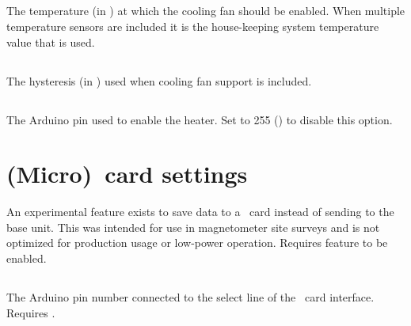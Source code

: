 \subsection[fan-temperature]{}
The temperature (in \degC{}) at which the cooling fan should be
enabled. When multiple temperature sensors are included it is the
house-keeping system temperature value that is used.

\subsection[fan-temperature-hysteresis]{}
The hysteresis (in \degC{}) used when cooling fan support is included.

\subsection[heater-pin]{}
The Arduino pin used to enable the heater. Set to 255 () to
disable this option.

\section[(Micro)SD card settings]{(Micro)\sd\ card settings}

An experimental feature exists to save data to a \sd\ card instead of
sending to the base unit. This was intended for use in magnetometer
site surveys and is not optimized for production usage or low-power
operation. Requires  feature to be enabled.



\subsection[sd-select]{}

The Arduino pin number connected to the select line of the \sd\ card interface.
Requires .

\subsection[use-sd]{}

